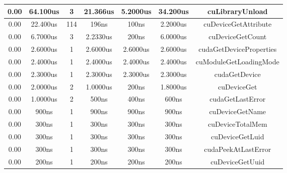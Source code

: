 \documentclass[
	a4paper, %
	12pt, %
]{class}
\begin{document}
\begin{center}
\begin{adjustbox}{width=1\textwidth}
\begin{tabular}{ |c|c|c|c|c|c|c| }
            0.00      & 64.100us  &   3   &   21.366us    &  5.2000us  &  34.200us &  cuLibraryUnload                                     \\ \hline
            0.00      & 22.400us  &   114 &   196ns       &  100ns     &  2.2000us &  cuDeviceGetAttribute                                \\ \hline
            0.00      & 6.7000us  &   3   &   2.2330us    &  200ns     &  6.0000us &  cuDeviceGetCount                                    \\ \hline
            0.00      & 2.6000us  &   1   &   2.6000us    &  2.6000us  &  2.6000us &  cudaGetDeviceProperties                             \\ \hline
            0.00      & 2.4000us  &   1   &   2.4000us    &  2.4000us  &  2.4000us &  cuModuleGetLoadingMode                              \\ \hline
            0.00      & 2.3000us  &   1   &   2.3000us    &  2.3000us  &  2.3000us &  cudaGetDevice                                       \\ \hline
            0.00      & 2.0000us  &   2   &   1.0000us    &  200ns     &  1.8000us &  cuDeviceGet                                         \\ \hline
            0.00      & 1.0000us  &   2   &   500ns       &  400ns     &  600ns    &  cudaGetLastError                                    \\ \hline
            0.00      & 900ns     &   1   &   900ns       &  900ns     &  900ns    &  cuDeviceGetName                                     \\ \hline
            0.00      & 300ns     &   1   &   300ns       &  300ns     &  300ns    &  cuDeviceTotalMem                                    \\ \hline
            0.00      & 300ns     &   1   &   300ns       &  300ns     &  300ns    &  cuDeviceGetLuid                                     \\ \hline
            0.00      & 300ns     &   1   &   300ns       &  300ns     &  300ns    &  cudaPeekAtLastError                                 \\ \hline
            0.00      & 200ns     &   1   &   200ns       &  200ns     &  200ns    &  cuDeviceGetUuid                                     \\ \hline  
        \end{tabular}
    \end{adjustbox}
\end{center}
\end{document}
